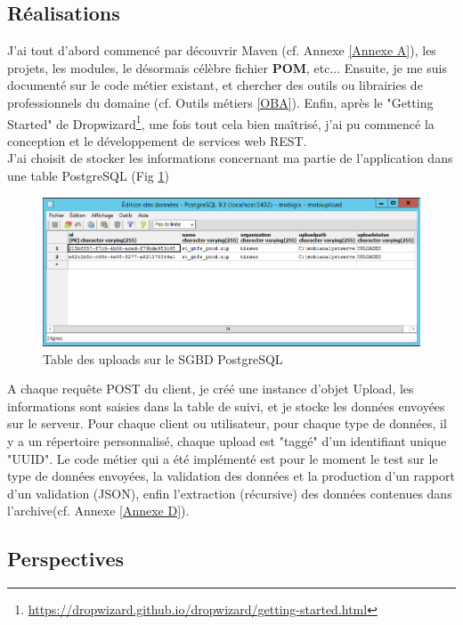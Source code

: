 \begin{itemize}
\subsection{Réalisations}

J'ai tout d'abord commencé par découvrir Maven (cf. Annexe \ref{Annexe A}), les projets, les modules, le désormais célèbre fichier \textbf{POM}, etc...
Ensuite, je me suis documenté sur le code métier existant, et chercher des outils ou librairies de professionnels du domaine (cf. Outils métiers \ref{OBA}).
Enfin, après le "Getting Started" de Dropwizard\footnote{\url{https://dropwizard.github.io/dropwizard/getting-started.html}}, une fois tout cela bien maîtrisé, j'ai pu  commencé la conception et le développement de services web REST.\\

J'ai choisit de stocker les informations concernant ma partie de l'application dans une table PostgreSQL (Fig \ref{TablePostgres})\\
\begin{figure}[!h]
\centering
\includegraphics[width=14cm]{images/tablePostgres_mobiupload_small.png}
\caption{\label{TablePostgres}Table des uploads sur le SGBD PostgreSQL}
\end{figure} 

A chaque requête POST du client, je créé une instance d'objet Upload, les informations sont saisies dans la table de suivi, et je stocke les données envoyées sur le serveur. Pour chaque client ou utilisateur, pour chaque type de données, il y a un répertoire personnalisé, chaque upload est "taggé" d'un identifiant unique "UUID".
Le code métier qui a été implémenté est pour le moment le test sur le type de données envoyées, la validation des données et la production d'un rapport d'un validation (JSON), enfin l'extraction (récursive) des données contenues dans l'archive(cf. Annexe \ref{Annexe D}).\\


\subsection{Perspectives}


\end{itemize}
